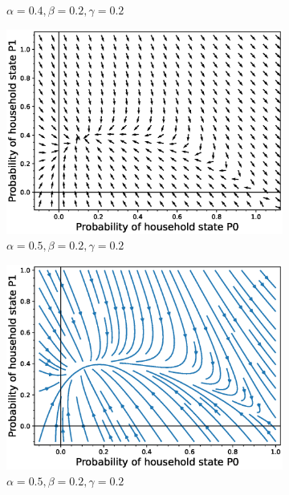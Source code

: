 \documentclass[paper=a4, fontsize=11pt, twoside, BCOR=12mm, parskip=full, listof=totoc]{scrreprt}
\begin{document}
{\begin{figure}[H]
\begin{subfigure}[b]{0.4\linewidth}
	   \caption{\(\alpha=0.4, \beta=0.2, \gamma=0.2\)}
	   \label{alpha four phasestreamplot}
	\end{subfigure}
	\begin{subfigure}[b]{0.4\linewidth}
	  \includegraphics[width=\linewidth]{phase_portrait/021_g2.eps}
	  \caption{\(\alpha=0.5, \beta=0.2, \gamma=0.2\)}
	  \label{alpha five phasevectorfield}
	\end{subfigure}
	\begin{subfigure}[b]{0.4\linewidth}
	  \includegraphics[width=\linewidth]{phase_portrait/021_g2s.eps}
	  \caption{\(\alpha=0.5, \beta=0.2, \gamma=0.2\)}
	  \label{alpha five phasestreamplot}
	\end{subfigure}
	\begin{subfigure}[b]{0.4\linewidth}

\end{subfigure}
\end{figure}}
\end{document}

